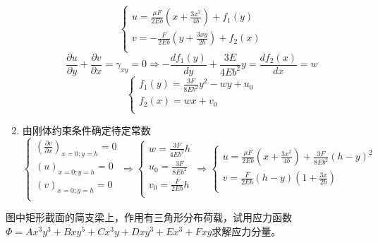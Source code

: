 \begin{remark}
\begin{enumerate}
\[\begin{cases}
		u=\frac{\mu F}{2Eb}\left( x+\frac{3x^2}{4b} \right) +f_1\left( y \right)\\
		v=-\frac{F}{2Eb}\left( y+\frac{3xy}{2b} \right) +f_2\left( x \right)\\
		\end{cases}\]
		\[\frac{\partial u}{\partial y}+\frac{\partial v}{\partial x}=\gamma _{xy}=0\Longrightarrow -\frac{df_1\left( y \right)}{dy}+\frac{3E}{4Eb^2}y=\frac{df_2\left( x \right)}{dx}=w\]
		\[\begin{cases}
		f_1\left( y \right) =\frac{3F}{8Eb^2}y^2-wy+u_0\\
		f_2\left( x \right) =wx+v_0\\
		\end{cases}\]
		\item 由刚体约束条件确定待定常数
		\[\begin{cases}
		\left( \frac{\partial v}{\partial x} \right) _{x=0;y=h}=0\\
		\left( u \right) _{x=0;y=h}=0\\
		\left( v \right) _{x=0;y=h}=0\\
		\end{cases}\Longrightarrow \begin{cases}
		w=\frac{3F}{4Eb^2}h\\
		u_0=\frac{3F}{8Eb^2}\\
		v_0=\frac{F}{2Eb}h\\
		\end{cases}\Longrightarrow \begin{cases}
		u=\frac{\mu F}{2Eb}\left( x+\frac{3x^2}{4b} \right) +\frac{3F}{8Eb^2}\left( h-y \right) ^2\\
		v=\frac{F}{2Eb}\left( h-y \right) \left( 1+\frac{3x}{2b} \right)\\
		\end{cases}\]
	\end{enumerate}
\end{remark}
\begin{example}
	图中矩形截面的简支梁上，作用有三角形分布荷载，试用应力函数$\varPhi =Ax^3y^3+Bxy^5+Cx^3y+Dxy^3+Ex^3+Fxy$求解应力分量。
\end{example}
